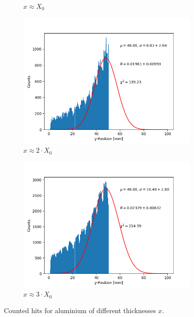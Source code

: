 \documentclass[sn-mathphys-num,iicol]{sn-jnl}
\theoremstyle{thmstyleone}
\theoremstyle{thmstyletwo}
\theoremstyle{thmstylethree}
\begin{document}
\begin{figure}[h]
\begin{subfigure}{0.49\textwidth}
        \caption{$x\approx X_0$}
    \end{subfigure}
    \begin{subfigure}{0.49\textwidth}
        \includegraphics[width=\textwidth]{../src/elsa/finished_plots/Aluminium, Two Radiation Lengths, 40cm Distance.png}
        \caption{$x\approx2\cdot X_0$}
    \end{subfigure}
    \begin{subfigure}{0.49\textwidth}
        \includegraphics[width=\textwidth]{../src/elsa/finished_plots/Aluminium, Three Radiation Lengths, 40cm Distance.png}
        \caption{$x\approx3\cdot X_0$}
    \end{subfigure}
    \caption{Counted hits for aluminium of different thicknesses $x$.}
    \label{fig:alu_gaus}
\end{figure}
\end{document}

